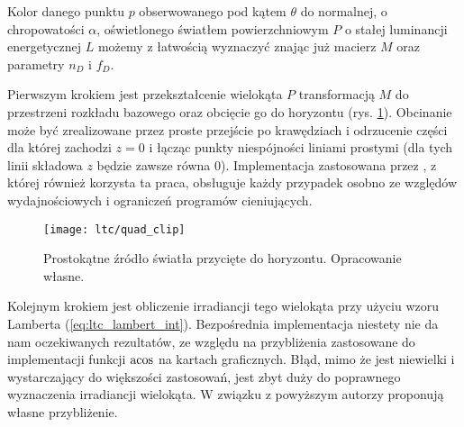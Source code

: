 \documentclass[../main.tex]{subfiles}
\begin{document}
Kolor danego punktu $p$ obserwowanego pod kątem $\theta$ do normalnej, o chropowatości $\alpha$, oświetlonego światłem powierzchniowym $P$ o stałej luminancji energetycznej $L$ możemy z łatwością wyznaczyć znając już macierz $M$ oraz parametry $n_D$ i $f_D$.

Pierwszym krokiem jest przekształcenie wielokąta $P$ transformacją $M$ do przestrzeni rozkładu bazowego oraz obcięcie go do horyzontu (rys. \ref{fig:QuadClip}). Obcinanie może być zrealizowane przez proste przejście po krawędziach i odrzucenie części dla której zachodzi $z=0$ i łącząc punkty niespójności liniami prostymi (dla tych linii składowa $z$ będzie zawsze równa $0$). Implementacja zastosowana przez \cite{ltc_heitz}, z której również korzysta ta praca, obsługuje każdy przypadek osobno ze względów wydajnościowych i ograniczeń programów cieniujących.

\begin{figure}[h]
    \centering
    \texttt{[image: ltc/quad\_clip]}
    \caption{Prostokątne źródło światła przycięte do horyzontu. Opracowanie własne.}
    \label{fig:QuadClip}
\end{figure}

Kolejnym krokiem jest obliczenie irradiancji tego wielokąta przy użyciu wzoru   Lamberta (\ref{eq:ltc_lambert_int}). Bezpośrednia implementacja niestety nie da nam oczekiwanych rezultatów, ze względu na przybliżenia zastosowane do implementacji funkcji $\acos$ na kartach graficznych. Błąd, mimo że jest niewielki i wystarczający do większości zastosowań, jest zbyt duży do poprawnego wyznaczenia irradiancji wielokąta. W związku z powyższym autorzy \cite{LTCJourneyPresentation} proponują własne przybliżenie.
\end{document}
